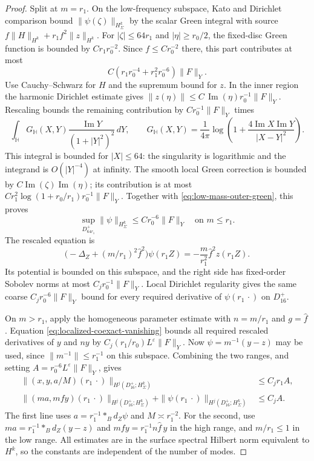 \documentclass[11pt]{amsart}
\theoremstyle{definition}
\theoremstyle{remark}
\theoremstyle{plain}
\begin{document}
\begin{proof}
Split at $m=r_1$. On the low-frequency subspace, Kato and
Dirichlet comparison bound $\|\psi(\zeta)\|_{H_\Sigma^k}$
by the scalar Green integral with source
$f\|H\|_{H^k}+r_1f^2\|z\|_{H^k}$.
For $|\zeta|\leq64r_1$ and $|\eta|\geq r_0/2$, the fixed-disc
Green function is bounded by $Cr_1r_0^{-2}$.
Since $f\leq Cr_0^{-2}$ there, this part contributes at most
\begin{equation}\label{eq:low-mass-outer-green}
 C(r_1r_0^{-4}+r_1^2r_0^{-6})\|F\|_Y.
\end{equation}
Use Cauchy--Schwarz for $H$ and the supremum bound for $z$.
In the inner region the harmonic Dirichlet estimate gives
$\|z(\eta)\|\leq C\,\operatorname{Im}(\eta)r_0^{-1}\|F\|_Y$.
Rescaling bounds the remaining contribution by
$Cr_0^{-1}\|F\|_Y$ times
\[
 \int_{\mathbb H}G_{\mathbb H}(X,Y)
             \frac{\operatorname{Im}Y}{(1+|Y|^2)^2}\,dY,\qquad
 G_{\mathbb H}(X,Y)=\frac1{4\pi}
 \log\left(1+\frac{4\operatorname{Im}X\operatorname{Im}Y}
                         {|X-Y|^2}\right).
\]
This integral is bounded for $|X|\leq64$: the singularity
is logarithmic and the integrand is $O(|Y|^{-4})$ at infinity.
The smooth local Green correction is bounded by
$C\operatorname{Im}(\zeta)\operatorname{Im}(\eta)$; its
contribution is at most
$Cr_1^2\log(1+r_0/r_1)r_0^{-1}\|F\|_Y$.
Together with \eqref{eq:low-mass-outer-green}, this proves
\[
 \sup_{D_{64r_1}^+}\|\psi\|_{H_\Sigma^k}
                         \leq Cr_0^{-6}\|F\|_Y
 \quad\text{on }m\leq r_1.
\]
The rescaled equation is
\[
 \bigl(-\Delta_Z+(m/r_1)^2\widehat f^2\bigr)\psi(r_1Z)
       =-\frac{m}{r_1^2}\widehat f^2z(r_1Z).
\]
Its potential is bounded on this subspace, and the right side
has fixed-order Sobolev norms at most $C_jr_0^{-1}\|F\|_Y$.
Local Dirichlet regularity gives the same coarse
$C_jr_0^{-6}\|F\|_Y$ bound for every required derivative of
$\psi(r_1\,\cdot)$ on $D_{16}^+$.

On $m>r_1$, apply the homogeneous parameter estimate with
$n=m/r_1$ and $g=\widehat f$. Equation
\eqref{eq:localized-coexact-vanishing} bounds all required
rescaled derivatives of $y$ and $ny$ by
$C_j(r_1/r_0)L^\varepsilon\|F\|_Y$.
Now $\psi=m^{-1}(y-z)$ may be used, since
$\|m^{-1}\|\leq r_1^{-1}$ on this subspace.
Combining the two ranges, and setting
$A=r_0^{-6}L^\varepsilon\|F\|_Y$, gives
\begin{equation}\label{eq:localized-rescaled-graph}
 \begin{aligned}
  \|(x,y,a/M)(r_1\,\cdot)\|_{H^j(D_{16}^+;H_\Sigma^k)}
       &\leq C_jr_1 A,\\
  \|(ma,mfy)(r_1\,\cdot)\|_{H^j(D_{16}^+;H_\Sigma^k)}
   +\|\psi(r_1\,\cdot)\|_{H^j(D_{16}^+;H_\Sigma^k)}
       &\leq C_j A .
 \end{aligned}
\end{equation}
The first line uses $a=r_1^{-1}*_B d_Z\psi$ and
$M\asymp r_1^{-2}$. For the second, use
$ma=r_1^{-1}*_B d_Z(y-z)$ and
$mfy=r_1^{-1}n\widehat f\,y$ in the high range, and
$m/r_1\leq1$ in the low range. All estimates are in the
surface spectral Hilbert norm equivalent to $H^k$, so the
constants are independent of the number of modes.


\end{proof}
\end{document}
